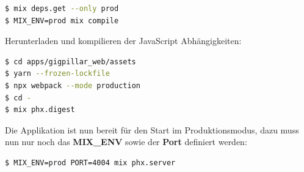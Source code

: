 \begin{lstlisting}[language=bash,frame=single]
$ mix deps.get --only prod
$ MIX_ENV=prod mix compile
\end{lstlisting}

\noindent{}Herunterladen und kompilieren der JavaScript Abhängigkeiten:

\begin{lstlisting}[language=bash,frame=single]
$ cd apps/gigpillar_web/assets
$ yarn --frozen-lockfile
$ npx webpack --mode production
$ cd -
$ mix phx.digest
\end{lstlisting}

\noindent{}Die Applikation ist nun bereit für den Start im Produktionsmodus,
dazu muss nun nur noch das \textbf{MIX\_ENV} sowie der \textbf{Port} definiert
werden:

\begin{lstlisting}[language=bash,frame=single]
$ MIX_ENV=prod PORT=4004 mix phx.server
\end{lstlisting}
